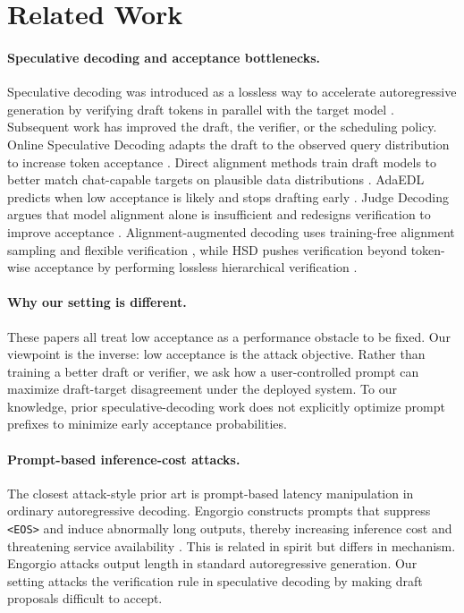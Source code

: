 \section{Related Work}

\paragraph{Speculative decoding and acceptance bottlenecks.}
Speculative decoding was introduced as a lossless way to accelerate
autoregressive generation by verifying draft tokens in parallel with the target
model \citep{leviathan2023speculative}. Subsequent work has improved the draft,
the verifier, or the scheduling policy. Online Speculative Decoding adapts the
draft to the observed query distribution to increase token acceptance
\citep{liu2023online}. Direct alignment methods train draft models to better
match chat-capable targets on plausible data distributions
\citep{goel2024direct}. AdaEDL predicts when low acceptance is likely and stops
drafting early \citep{agrawal2024adaedl}. Judge Decoding argues that model
alignment alone is insufficient and redesigns verification to improve acceptance
\citep{bachmann2025judge}. Alignment-augmented decoding uses training-free
alignment sampling and flexible verification \citep{wang2025alignment}, while
HSD pushes verification beyond token-wise acceptance by performing lossless
hierarchical verification \citep{zhou2026hsd}.

\paragraph{Why our setting is different.}
These papers all treat low acceptance as a performance obstacle to be fixed.
Our viewpoint is the inverse: low acceptance is the attack objective. Rather
than training a better draft or verifier, we ask how a user-controlled prompt
can maximize draft-target disagreement under the deployed system. To our
knowledge, prior speculative-decoding work does not explicitly optimize prompt
prefixes to minimize early acceptance probabilities.

\paragraph{Prompt-based inference-cost attacks.}
The closest attack-style prior art is prompt-based latency manipulation in
ordinary autoregressive decoding. Engorgio constructs prompts that suppress
\texttt{<EOS>} and induce abnormally long outputs, thereby increasing inference
cost and threatening service availability \citep{dong2024engorgio}. This is
related in spirit but differs in mechanism. Engorgio attacks output length in
standard autoregressive generation. Our setting attacks the verification rule in
speculative decoding by making draft proposals difficult to accept.

